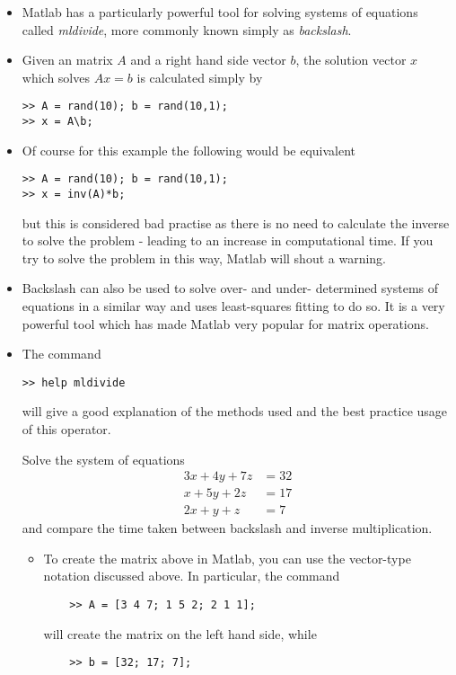 \documentclass[12pt]{report}
\begin{document}
\begin{itemize}
\item Matlab has a particularly powerful tool for solving systems of equations called \textit{mldivide}, more commonly known simply as \textit{backslash}.
\item Given an matrix $A$ and a right hand side vector $b$, the solution vector $x$ which solves $Ax = b$ is calculated simply by
\begin{lstlisting}
>> A = rand(10); b = rand(10,1);
>> x = A\b;
\end{lstlisting}
\item Of course for this example the following would be equivalent
\begin{lstlisting}
>> A = rand(10); b = rand(10,1);
>> x = inv(A)*b;
\end{lstlisting}
but this is considered bad practise as there is no need to calculate the inverse to solve the problem - leading to an increase in computational time. If you try to solve the problem in this way, Matlab will shout a warning.
\item Backslash can also be used to solve over- and under- determined systems of equations in a similar way and uses least-squares fitting to do so. It is a very powerful tool which has made Matlab very popular for matrix operations.
\item The command
\begin{lstlisting}
>> help mldivide
\end{lstlisting}
will give a good explanation of the methods used and the best practice usage of this operator.
\begin{tcolorbox}[title=Task]
	Solve the system of equations 
	\begin{align*}
	3x + 4y + 7z &= 32 \\
	x + 5y + 2z &= 17 \\
	2x + y + z &= 7
	\end{align*}
	and compare the time taken between backslash and inverse multiplication.
	\tcblower
	\begin{itemize}
	\item To create the matrix above in Matlab, you can use the vector-type notation discussed above. In particular, the command
	\begin{lstlisting}
	>> A = [3 4 7; 1 5 2; 2 1 1];
	\end{lstlisting}
	will create the matrix on the left hand side, while
	\begin{lstlisting}
	>> b = [32; 17; 7];
	\end{lstlisting}

\end{itemize}
\end{tcolorbox}
\end{itemize}
\end{document}
